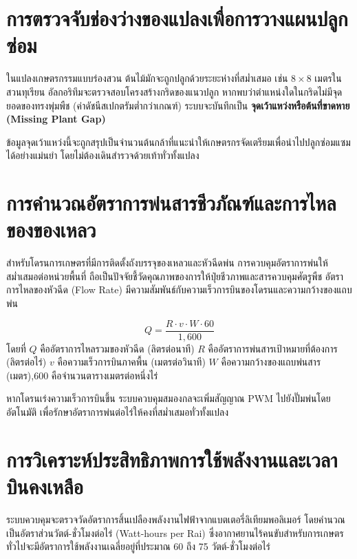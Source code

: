 \section{การตรวจจับช่องว่างของแปลงเพื่อการวางแผนปลูกซ่อม}

ในแปลงเกษตรกรรมแบบร่องสวน ต้นไม้มักจะถูกปลูกด้วยระยะห่างที่สม่ำเสมอ เช่น $8 \times 8$ เมตรในสวนทุเรียน อัลกอริทึมจะตรวจสอบโครงสร้างกริดของแนวปลูก หากพบว่าตำแหน่งใดในกริดไม่มีจุดยอดของทรงพุ่มพืช (ค่าดัชนีสเปกตรัมต่ำกว่าเกณฑ์) ระบบจะบันทึกเป็น \textbf{จุดเว้าแหว่งหรือต้นที่ขาดหาย (Missing Plant Gap)}

ข้อมูลจุดเว้าแหว่งนี้จะถูกสรุปเป็นจำนวนต้นกล้าที่แนะนำให้เกษตรกรจัดเตรียมเพื่อนำไปปลูกซ่อมแซมได้อย่างแม่นยำ โดยไม่ต้องเดินสำรวจด้วยเท้าทั่วทั้งแปลง

\section{การคำนวณอัตราการพ่นสารชีวภัณฑ์และการไหลของของเหลว}

สำหรับโดรนการเกษตรที่มีการติดตั้งถังบรรจุของเหลวและหัวฉีดพ่น การควบคุมอัตราการพ่นให้สม่ำเสมอต่อหน่วยพื้นที่ ถือเป็นปัจจัยชี้วัดคุณภาพของการให้ปุ๋ยชีวภาพและสารควบคุมศัตรูพืช อัตราการไหลของหัวฉีด (Flow Rate) มีความสัมพันธ์กับความเร็วการบินของโดรนและความกว้างของแถบพ่น

\begin{formulabox}
\begin{equation}
Q = \frac{R \cdot v \cdot W \cdot 60}{1,600}
\label{eq:flow_rate}
\end{equation}
โดยที่
$Q$ คืออัตราการไหลรวมของหัวฉีด (ลิตรต่อนาที)\newline
$R$ คืออัตราการพ่นสารเป้าหมายที่ต้องการ (ลิตรต่อไร่)\newline
$v$ คือความเร็วการบินภาคพื้น (เมตรต่อวินาที)\newline
$W$ คือความกว้างของแถบพ่นสาร (เมตร),600 คือจำนวนตารางเมตรต่อหนึ่งไร่
\end{formulabox}

หากโดรนเร่งความเร็วการบินขึ้น ระบบควบคุมสมองกลจะเพิ่มสัญญาณ PWM ไปยังปั๊มพ่นโดยอัตโนมัติ เพื่อรักษาอัตราการพ่นต่อไร่ให้คงที่สม่ำเสมอทั่วทั้งแปลง

\section{การวิเคราะห์ประสิทธิภาพการใช้พลังงานและเวลาบินคงเหลือ}

ระบบควบคุมจะตรวจวัดอัตราการสิ้นเปลืองพลังงานไฟฟ้าจากแบตเตอรี่ลิเทียมพอลิเมอร์ โดยคำนวณเป็นอัตราส่วนวัตต์-ชั่วโมงต่อไร่ (Watt-hours per Rai) ซึ่งอากาศยานไร้คนขับสำหรับการเกษตรทั่วไปจะมีอัตราการใช้พลังงานเฉลี่ยอยู่ที่ประมาณ 60 ถึง 75 วัตต์-ชั่วโมงต่อไร่

